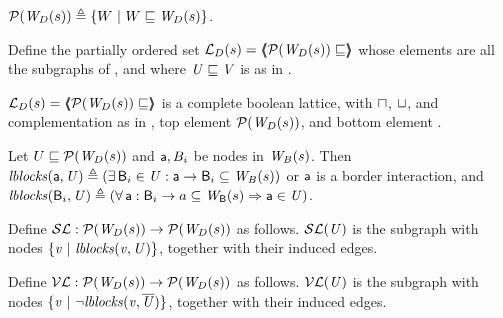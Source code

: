 \begin{definition} \label{defn:wsetOfSubgraphsLoc}
$\lwfgS{B}{s}{\DS} \df  \set{ W \stt W \subg \lwfg{B}{s}{\DS} }$.
\end{definition}

\begin{definition} \label{defn:wflatticeLoc}
Define the partially ordered set 
$\llat{\B}{s}{\DS}  = \tpl{ \lwfgS{B}{s}{\DS}  \subg }$ 
whose elements are all the subgraphs of 
, and where  $\US \subg \VS$ is as in .   
\end{definition}

\begin{proposition} \label{prop:isALatticeLoc}
$\llat{\B}{s}{\DS}  = \tpl{ \lwfgS{B}{s}{\DS}  \subg }$
 is a complete boolean lattice, with $\meet$, $\join$, and complementation as in 
, top element $\lwfgS{B}{s}{\DS}$, and bottom element \ewfg.
\end{proposition}

\begin{definition} \label{defn:blocksLoc}
Let $U \subg \lwfgS{B}{s}{\DS}$ and $\act, B_i$ be nodes in $\wfg{B}{s}$. Then 
$\lblocks{\act}{\US} \df (\ex \B_i \in \US : \act \ar \B_i \sub \wfg{B}{s})$ or $\act$ is a border interaction, and 
$\lblocks{\B_i}{\US} \df (\fa \act : \B_i \ar a \sub\wfg{\B}{s} \imp \act \in \US)$.
\end{definition}


\begin{definition} \label{defn:scFixLoc}
Define $\lSFs:  \lwfgS{B}{s}{\DS}  \to  \lwfgS{B}{s}{\DS}$ as follows.
$\lSF{\US}$ is the subgraph with nodes $\set{\ndv \stt \lblocks{\ndv}{\US} }$, together with their induced edges.
\end{definition}

\begin{definition} \label{defn:violFixLoc}
Define $\lVFs: \lwfgS{B}{s}{\DS}  \to  \lwfgS{B}{s}{\DS}$ as follows.
$\lVF{\US}$ is the subgraph with nodes $\set{\ndv \stt \neg \lblocks{\ndv}{\compl{\US}} }$, together with their induced edges.
\end{definition}

